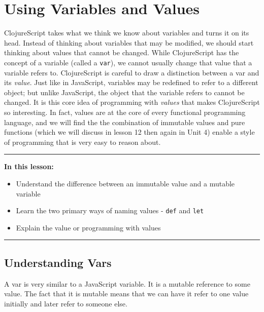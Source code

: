 \documentclass[10pt,twoside,openright]{memoir}
\begin{document}
\chapter{Using Variables and Values}

ClojureScript takes what we think we know about variables and turns it
on its head. Instead of thinking about variables that may be modified,
we should start thinking about values that cannot be changed. While
ClojureScript has the concept of a variable (called a \texttt{var}), we
cannot usually change that value that a variable refers to.
ClojureScript is careful to draw a distinction between a var and its
\emph{value}. Just like in JavaScript, variables may be redefined to
refer to a different object; but unlike JavaScript, the object that the
variable refers to cannot be changed. It is this core idea of
programming with \emph{values} that makes ClojureScript so interesting.
In fact, values are at the core of every functional programming
language, and we will find the the combination of immutable values and
pure functions (which we will discuss in lesson 12 then again in Unit 4)
enable a style of programming that is very easy to reason about.

\begin{center}\rule{0.5\linewidth}{0.5pt}\end{center}

\textbf{In this lesson:}

\begin{itemize}
\tightlist
\item
  Understand the difference between an immutable value and a mutable
  variable
\item
  Learn the two primary ways of naming values - \texttt{def} and
  \texttt{let}
\item
  Explain the value or programming with values
\end{itemize}

\begin{center}\rule{0.5\linewidth}{0.5pt}\end{center}


\section{Understanding Vars}

A var is very similar to a JavaScript variable. It is a mutable
reference to some value. The fact that it is mutable means that we can
have it refer to one value initially and later refer to someone else.
\end{document}
